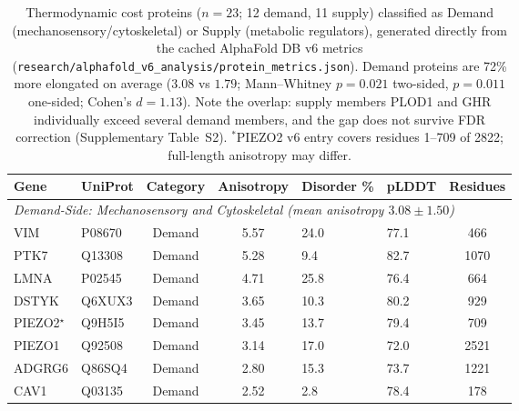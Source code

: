 \begin{table}[h!]
\centering
\caption{Thermodynamic cost proteins ($n=23$; 12 demand, 11 supply) classified as Demand (mechanosensory/cytoskeletal) or Supply (metabolic regulators), generated directly from the cached AlphaFold DB v6 metrics (\texttt{research/alphafold\_v6\_analysis/protein\_metrics.json}). Demand proteins are 72\% more elongated on average ($3.08$ vs $1.79$; Mann--Whitney $p = 0.021$ two-sided, $p = 0.011$ one-sided; Cohen's $d = 1.13$). Note the overlap: supply members PLOD1 and GHR individually exceed several demand members, and the gap does not survive FDR correction (Supplementary Table~S2). $^*$PIEZO2 v6 entry covers residues 1--709 of 2822; full-length anisotropy may differ.}
\label{tab:thermodynamic_cost_proteins}
\scriptsize
\begin{tabular}{llccllc}
\toprule
\textbf{Gene} & \textbf{UniProt} & \textbf{Category} & \textbf{Anisotropy} & \textbf{Disorder \%} & \textbf{pLDDT} & \textbf{Residues} \\
\midrule
\multicolumn{7}{l}{\textit{Demand-Side: Mechanosensory and Cytoskeletal (mean anisotropy $3.08 \pm 1.50$)}} \\
VIM & P08670 & Demand & 5.57 & 24.0 & 77.1 & 466 \\
PTK7 & Q13308 & Demand & 5.28 & 9.4 & 82.7 & 1070 \\
LMNA & P02545 & Demand & 4.71 & 25.8 & 76.4 & 664 \\
DSTYK & Q6XUX3 & Demand & 3.65 & 10.3 & 80.2 & 929 \\
PIEZO2$^{\star}$ & Q9H5I5 & Demand & 3.45 & 13.7 & 79.4 & 709 \\
PIEZO1 & Q92508 & Demand & 3.14 & 17.0 & 72.0 & 2521 \\
ADGRG6 & Q86SQ4 & Demand & 2.80 & 15.3 & 73.7 & 1221 \\
CAV1 & Q03135 & Demand & 2.52 & 2.8 & 78.4 & 178 \\

\end{tabular}
\end{table}
